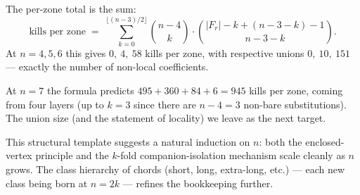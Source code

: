 \documentclass[11pt]{article}
\theoremstyle{definition}
\begin{document}
The per-zone total is the sum:
\[
\text{kills per zone}\;=\;\sum_{k=0}^{\lfloor (n-3)/2\rfloor}
\binom{n-4}{k}\cdot\binom{|F_r|-k+(n-3-k)-1}{n-3-k}.
\]
At $n=4,5,6$ this gives $0,\ 4,\ 58$ kills per zone, with respective unions
$0,\ 10,\ 151$ --- exactly the number of non-local coefficients.

At $n=7$ the formula predicts
$495+360+84+6=945$ kills per zone, coming from four layers (up to $k=3$
since there are $n-4=3$ non-bare substitutions). The union size (and the
statement of locality) we leave as the next target.

This structural template suggests a natural induction on $n$: both the
enclosed-vertex principle and the $k$-fold companion-isolation mechanism
scale cleanly as $n$ grows. The class hierarchy of chords (short, long,
extra-long, etc.) --- each new class being born at $n=2k$ --- refines the
bookkeeping further.
\end{document}
